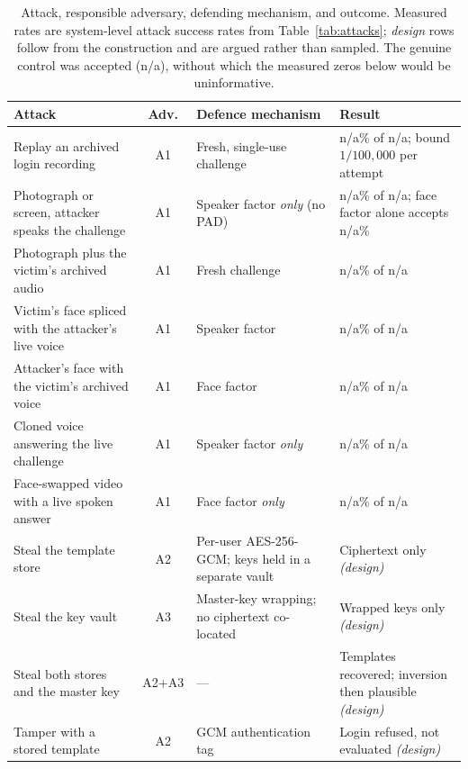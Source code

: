 \documentclass[runningheads]{llncs}
\providecommand{\AttackChallengeSpace}{100{,}000}
\providecommand{\AttackControlValid}{n/a}
\providecommand{\AttackReplayASR}{n/a}
\providecommand{\AttackReplayN}{n/a}
\providecommand{\AttackSpliceVictimFaceASR}{n/a}
\providecommand{\AttackSpliceVictimFaceN}{n/a}
\providecommand{\AttackSpliceVictimVoiceASR}{n/a}
\providecommand{\AttackSpliceVictimVoiceN}{n/a}
\providecommand{\AttackPhotoLiveVoiceASR}{n/a}
\providecommand{\AttackPhotoLiveVoiceFaceASR}{n/a}
\providecommand{\AttackPhotoLiveVoiceN}{n/a}
\providecommand{\AttackPhotoArchivedAudioASR}{n/a}
\providecommand{\AttackPhotoArchivedAudioN}{n/a}
\providecommand{\AttackVoiceCloneASR}{n/a}
\providecommand{\AttackVoiceCloneN}{n/a}
\providecommand{\AttackFaceSwapASR}{n/a}
\providecommand{\AttackFaceSwapN}{n/a}
\begin{document}
{\begin{table}[!t]
\caption{Attack, responsible adversary, defending mechanism, and outcome. Measured rates are system-level attack success rates from Table~\ref{tab:attacks}; \emph{design} rows follow from the construction and are argued rather than sampled. The genuine control was accepted (\AttackControlValid), without which the measured zeros below would be uninformative.}
\label{tab:attackdefence}
\centering
\renewcommand{\arraystretch}{1.15}
\setlength{\tabcolsep}{4pt}
\scriptsize
\begin{tabular}{@{}p{4.1cm}cp{3.6cm}p{3.5cm}@{}}
\toprule
\textbf{Attack} & \textbf{Adv.} & \textbf{Defence mechanism} & \textbf{Result} \\
\midrule
Replay an archived login recording & A1 & Fresh, single-use challenge & \AttackReplayASR\% of \AttackReplayN; bound $1/\AttackChallengeSpace$ per attempt \\
Photograph or screen, attacker speaks the challenge & A1 & Speaker factor \emph{only} (no PAD) & \AttackPhotoLiveVoiceASR\% of \AttackPhotoLiveVoiceN; face factor alone accepts \AttackPhotoLiveVoiceFaceASR\% \\
Photograph plus the victim's archived audio & A1 & Fresh challenge & \AttackPhotoArchivedAudioASR\% of \AttackPhotoArchivedAudioN \\
Victim's face spliced with the attacker's live voice & A1 & Speaker factor & \AttackSpliceVictimFaceASR\% of \AttackSpliceVictimFaceN \\
Attacker's face with the victim's archived voice & A1 & Face factor & \AttackSpliceVictimVoiceASR\% of \AttackSpliceVictimVoiceN \\
Cloned voice answering the live challenge & A1 & Speaker factor \emph{only} & \AttackVoiceCloneASR\% of \AttackVoiceCloneN \\
Face-swapped video with a live spoken answer & A1 & Face factor \emph{only} & \AttackFaceSwapASR\% of \AttackFaceSwapN \\
\midrule
Steal the template store & A2 & Per-user AES-256-GCM; keys held in a separate vault & Ciphertext only \emph{(design)} \\
Steal the key vault & A3 & Master-key wrapping; no ciphertext co-located & Wrapped keys only \emph{(design)} \\
Steal both stores and the master key & A2+A3 & --- & Templates recovered; inversion then plausible \emph{(design)} \\
Tamper with a stored template & A2 & GCM authentication tag & Login refused, not evaluated \emph{(design)} \\

\end{tabular}
\end{table}}
\end{document}
